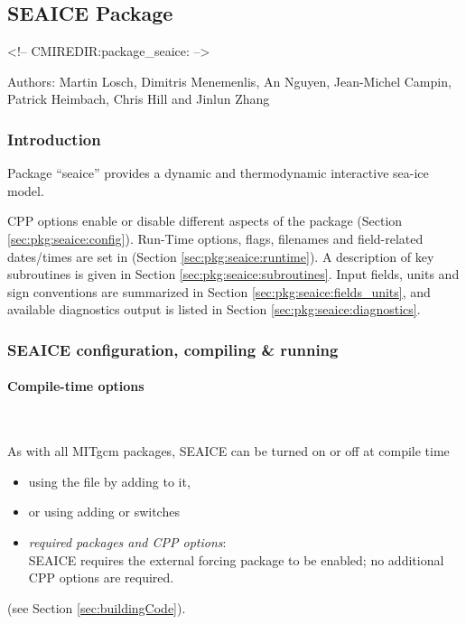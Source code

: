 


\subsection{SEAICE Package}
\label{sec:pkg:seaice}
\begin{rawhtml}
<!-- CMIREDIR:package_seaice: -->
\end{rawhtml}

Authors: Martin Losch, Dimitris Menemenlis, An Nguyen, Jean-Michel Campin,
Patrick Heimbach, Chris Hill and Jinlun Zhang

\subsubsection{Introduction
\label{sec:pkg:seaice:intro}}


Package ``seaice'' provides a dynamic and thermodynamic interactive
sea-ice model. 

CPP options enable or disable different aspects of the package
(Section \ref{sec:pkg:seaice:config}).
Run-Time options, flags, filenames and field-related dates/times are
set in 
(Section \ref{sec:pkg:seaice:runtime}).
A description of key subroutines is given in Section
\ref{sec:pkg:seaice:subroutines}.
Input fields, units and sign conventions are summarized in
Section \ref{sec:pkg:seaice:fields_units}, and available diagnostics
output is listed in Section \ref{sec:pkg:seaice:diagnostics}.


\subsubsection{SEAICE configuration, compiling \& running}

\paragraph{Compile-time options
\label{sec:pkg:seaice:config}}
~

As with all MITgcm packages, SEAICE can be turned on or off at compile time
%
\begin{itemize}
%
\item
using the  file by adding  to it,
%
\item
or using  adding
 or  switches
%
\item
\textit{required packages and CPP options}: \\
SEAICE requires the external forcing package  to be enabled;
no additional CPP options are required.
%
\end{itemize}
(see Section \ref{sec:buildingCode}).

